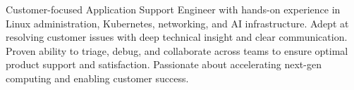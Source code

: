 
\begin{cvparagraph}
Customer-focused Application Support Engineer with hands-on experience in Linux administration, Kubernetes, networking, and AI infrastructure. Adept at resolving customer issues with deep technical insight and clear communication. Proven ability to triage, debug, and collaborate across teams to ensure optimal product support and satisfaction. Passionate about accelerating next-gen computing and enabling customer success.
\end{cvparagraph}
